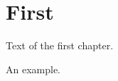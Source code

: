 \documentclass{scrreprt}
\begin{document}
\chapter{First}
Text of the first chapter.
\begin{example}[h]
\centering An example.
\caption{New example}
\end{example}
\end{document}
